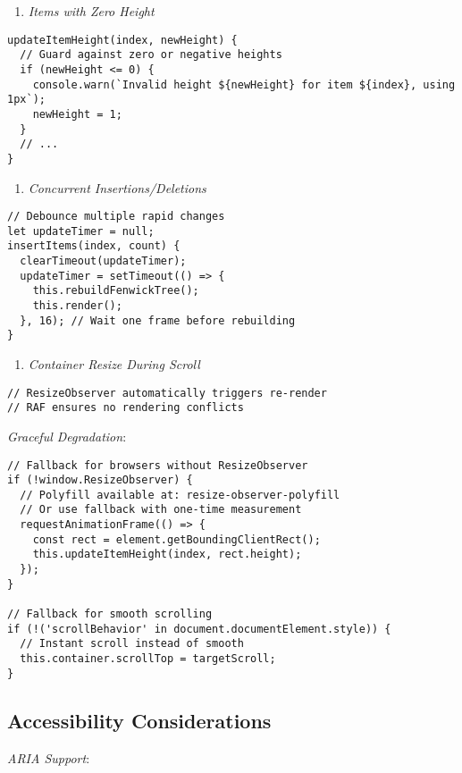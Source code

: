 \documentclass[11pt]{article}
\begin{document}
\begin{enumerate}
\item \emph{Items with Zero Height}
\end{enumerate}
\begin{verbatim}
updateItemHeight(index, newHeight) {
  // Guard against zero or negative heights
  if (newHeight <= 0) {
    console.warn(`Invalid height ${newHeight} for item ${index}, using 1px`);
    newHeight = 1;
  }
  // ...
}
\end{verbatim}

\begin{enumerate}
\item \emph{Concurrent Insertions/Deletions}
\end{enumerate}
\begin{verbatim}
// Debounce multiple rapid changes
let updateTimer = null;
insertItems(index, count) {
  clearTimeout(updateTimer);
  updateTimer = setTimeout(() => {
    this.rebuildFenwickTree();
    this.render();
  }, 16); // Wait one frame before rebuilding
}
\end{verbatim}

\begin{enumerate}
\item \emph{Container Resize During Scroll}
\end{enumerate}
\begin{verbatim}
// ResizeObserver automatically triggers re-render
// RAF ensures no rendering conflicts
\end{verbatim}

\emph{Graceful Degradation}:

\begin{verbatim}
// Fallback for browsers without ResizeObserver
if (!window.ResizeObserver) {
  // Polyfill available at: resize-observer-polyfill
  // Or use fallback with one-time measurement
  requestAnimationFrame(() => {
    const rect = element.getBoundingClientRect();
    this.updateItemHeight(index, rect.height);
  });
}

// Fallback for smooth scrolling
if (!('scrollBehavior' in document.documentElement.style)) {
  // Instant scroll instead of smooth
  this.container.scrollTop = targetScroll;
}
\end{verbatim}
\subsection{Accessibility Considerations}
\label{sec:org3bc00c8}

\emph{ARIA Support}:
\end{document}
